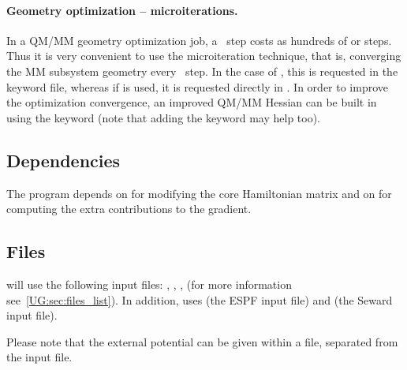 \paragraph{Geometry optimization -- microiterations.}
In a QM/MM geometry optimization job, a \molcas\ step costs as hundreds of  or  steps. Thus it is very convenient to use the microiteration technique, that is, converging the MM subsystem geometry every \molcas\ step. In the case of , this is requested in the  keyword file, whereas if  is used, it is requested directly in . In order to improve the optimization convergence, an improved QM/MM Hessian can be built in  using the  keyword (note that adding the keyword  may help too).


\subsection{Dependencies}
\label{UG:sec:espf_dependencies}
The  program depends on  for modifying the core Hamiltonian matrix and on  for computing the extra contributions to the gradient.

\subsection{Files}
\label{UG:sec:espf_files}
 will use the following input
files: , , ,  (for more information see~\ref{UG:sec:files_list}).
In addition,  uses  (the ESPF input file) and  (the Seward input file).

Please note that the external potential can be given within a file, separated from the  input file.

